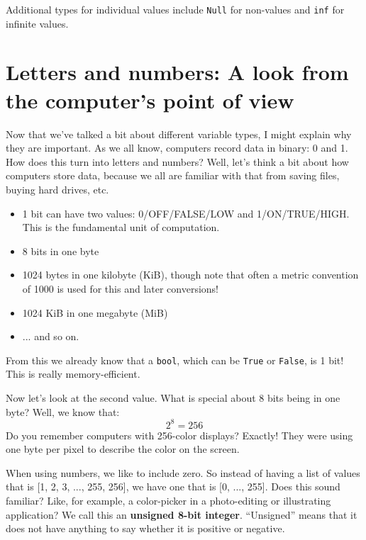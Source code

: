 \documentclass[a4paper,10pt]{scrartcl}
\begin{document}
Additional types for individual values include \lstinline{Null} for non-values and \lstinline{inf} for infinite values.

\section{Letters and numbers: A look from the computer's point of view}

Now that we've talked a bit about different variable types, I might explain why they are important. As we all know, computers record data in binary: 0 and 1. How does this turn into letters and numbers? Well, let's think a bit about how computers store data, because we all are familiar with that from saving files, buying hard drives, etc.

\begin{itemize}
 \item 1 bit can have two values: 0/OFF/FALSE/LOW and 1/ON/TRUE/HIGH. This is the fundamental unit of computation.
 \item 8 bits in one byte
 \item 1024 bytes in one kilobyte (KiB), though note that often a metric convention of 1000 is used for this and later conversions!
 \item 1024 KiB in one megabyte (MiB)
 \item ... and so on.
\end{itemize}

From this we already know that a \lstinline{bool}, which can be \lstinline{True} or \lstinline{False}, is 1 bit! This is really memory-efficient.

Now let's look at the second value. What is special about 8 bits being in one byte? Well, we know that:
\begin{equation}
 2^8 = 256
\end{equation}
Do you remember computers with 256-color displays? Exactly! They were using one byte per pixel to describe the color on the screen.

When using numbers, we like to include zero. So instead of having a list of values that is [1, 2, 3, ..., 255, 256], we have one that is [0, ..., 255]. Does this sound familiar? Like, for example, a color-picker in a photo-editing or illustrating application? We call this an \textbf{unsigned 8-bit integer}. ``Unsigned'' means that it does not have anything to say whether it is positive or negative.
\end{document}

